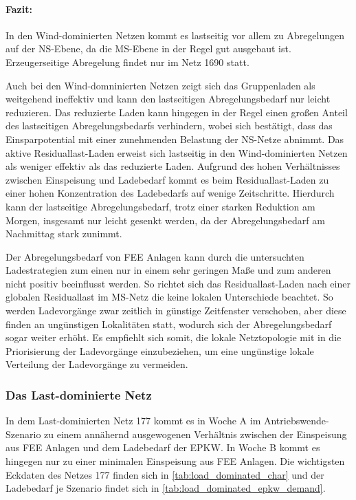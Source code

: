 \paragraph{Fazit:}

In den Wind-dominierten Netzen kommt es lastseitig vor allem zu Abregelungen auf der \gls{NS}-Ebene, da die \gls{MS}-Ebene in der Regel gut ausgebaut ist.
Erzeugerseitige Abregelung findet nur im Netz \num{1690} statt.\medskip

Auch bei den Wind-domninierten Netzen zeigt sich das Gruppenladen als weitgehend ineffektiv und kann den lastseitigen Abregelungsbedarf nur leicht reduzieren.
Das reduzierte Laden kann hingegen in der Regel einen großen Anteil des lastseitigen Abregelungsbedarfs verhindern, wobei sich bestätigt, dass das Einsparpotential mit einer zunehmenden Belastung der \gls{NS}-Netze abnimmt.
Das aktive Residuallast-Laden erweist sich lastseitig in den Wind-dominierten Netzen als weniger effektiv als das reduzierte Laden.
Aufgrund des hohen Verhältnisses zwischen Einspeisung und Ladebedarf kommt es beim Residuallast-Laden zu einer hohen Konzentration des Ladebedarfs auf wenige Zeitschritte.
Hierdurch kann der lastseitige Abregelungsbedarf, trotz einer starken Reduktion am Morgen, insgesamt nur leicht gesenkt werden, da der Abregelungsbedarf am Nachmittag stark zunimmt.\medskip

Der Abregelungsbedarf von \gls{FEE} Anlagen kann durch die untersuchten Ladestrategien zum einen nur in einem sehr geringen Maße und zum anderen nicht positiv beeinflusst werden.
So richtet sich das Residuallast-Laden nach einer globalen Residuallast im \gls{MS}-Netz die keine lokalen Unterschiede beachtet.
So werden Ladevorgänge zwar zeitlich in günstige Zeitfenster verschoben, aber diese finden an ungünstigen Lokalitäten statt, wodurch sich der Abregelungsbedarf sogar weiter erhöht.
Es empfiehlt sich somit, die lokale Netztopologie mit in die Priorisierung der Ladevorgänge einzubeziehen, um eine ungünstige lokale Verteilung der Ladevorgänge zu vermeiden.


\subsubsection{Das Last-dominierte Netz}

In dem Last-dominierten Netz \num{177} kommt es in Woche A im Antriebswende-Szenario zu einem annähernd ausgewogenen Verhältnis zwischen der Einspeisung aus \gls{FEE} Anlagen und dem Ladebedarf der \gls{EPKW}.
In Woche B kommt es hingegen nur zu einer minimalen Einspeisung aus \gls{FEE} Anlagen.
Die wichtigsten Eckdaten des Netzes \num{177} finden sich in \autoref{tab:load_dominated_char} und der Ladebedarf je Szenario findet sich in \autoref{tab:load_dominated_epkw_demand}.

